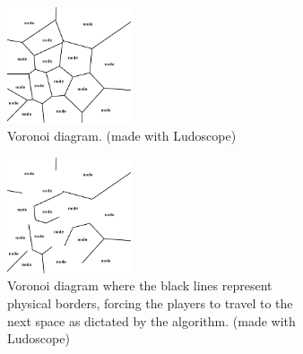 \documentclass[11pt,a4paper,twocolumn]{article}
\begin{document}
\begin{figure}[h]
	\centering
	\begin{subfigure}[b]{0.5\textwidth}
		\centering
		\includegraphics[width=0.4\textwidth]{images/ludovoronoi.png}
		\caption{Voronoi diagram. (made with Ludoscope)}\label{fig:ludo:voronoi}
	\end{subfigure}
	
	\begin{subfigure}[b]{0.5\textwidth}
		\centering
		\includegraphics[width=0.4\textwidth]{images/ludovoronoiopen.png}
		\caption{Voronoi diagram where the black lines represent physical borders, forcing the players to travel to the next space as dictated by the algorithm. (made with Ludoscope)}\label{fig:ludo:voronoiopen}
	\end{subfigure}
	\caption{ }\label{fig:ludo:voronois}
\end{figure}
\end{document}
